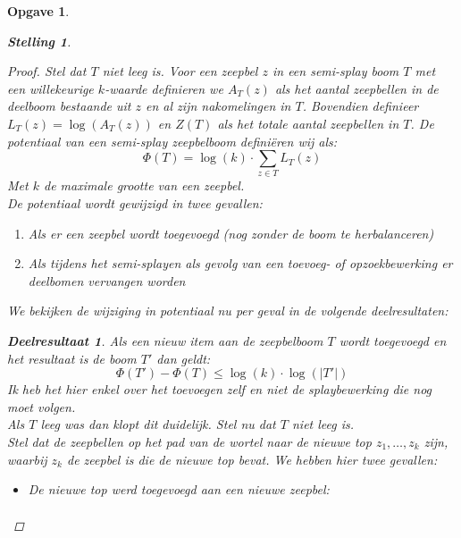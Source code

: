 \documentclass[12pt,hidelinks]{article}
\newtheorem{opgave}{Opgave}
\newtheorem{stelling}{Stelling}
\newtheorem{deelresultaat}{Deelresultaat}
\newcommand{\newln}{~\\\vspace{0.5em}}
\begin{document}
\begin{opgave}
\begin{description}
\begin{stelling}
\begin{proof}
                        Stel dat $T$ niet leeg is. 
                        Voor een zeepbel $z$ in een semi-splay boom $T$ met een willekeurige $k$-waarde definieren we $A_T(z)$ als het aantal zeepbellen in de deelboom bestaande uit
                        $z$ en al zijn nakomelingen in $T$. Bovendien definieer $L_T(z) = \log(A_T(z))$ en $Z(T)$ als het totale aantal zeepbellen in $T$.
                        De potentiaal van een semi-splay zeepbelboom definiëren wij als:
                        \begin{equation}
                            \Phi(T) = \log(k)\cdot\sum _{z\in T}{L_T(z)}
                        \end{equation}
                        Met $k$ de maximale grootte van een zeepbel.
                        \newln
                        De potentiaal wordt gewijzigd in twee gevallen:
                        \begin{enumerate}[1.]
                            \item Als er een zeepbel wordt toegevoegd (nog zonder de boom te herbalanceren)
                            \item Als tijdens het semi-splayen als gevolg van een toevoeg- of opzoekbewerking er deelbomen vervangen worden
                        \end{enumerate}
                        We bekijken de wijziging in potentiaal nu per geval in de volgende deelresultaten:
                        \newpage
                        \begin{deelresultaat}
                            Als een nieuw item aan de zeepbelboom $T$ wordt toegevoegd en het resultaat is de boom $T'$ dan geldt: $$\Phi(T')-\Phi(T)\le\log(k)\cdot\log(|T'|)$$
                            \normalfont
                            Ik heb het hier enkel over het toevoegen zelf en niet de splaybewerking die nog moet volgen.
                            \newln
                            Als $T$ leeg was dan klopt dit duidelijk. Stel nu dat $T$ niet leeg is.
                            \newln
                            Stel dat de zeepbellen op het pad van de wortel naar de nieuwe top $z_1,\ldots,z_k$ zijn, waarbij $z_k$ de zeepbel is die de nieuwe top bevat.
                            We hebben hier twee gevallen:
                            \begin{itemize}
                                \item De nieuwe top werd toegevoegd aan een nieuwe zeepbel:
                                    \begin{align*}

\end{align*}
\end{itemize}
\end{deelresultaat}
\end{proof}
\end{stelling}
\end{description}
\end{opgave}
\end{document}
